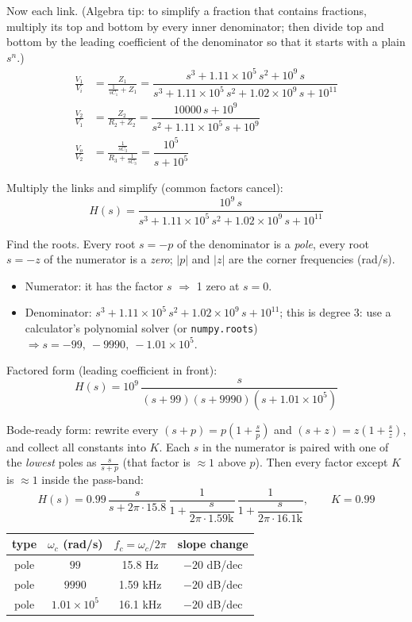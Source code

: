 \documentclass[11pt]{article}
\newcommand{\solstep}[2]{\par\medskip{\color{stepc}\textbf{Step #1 --- #2}}\par\nopagebreak}
\begin{document}
Now each link. {\small (Algebra tip: to simplify a fraction that contains fractions, multiply its top and bottom by every inner denominator; then divide top and bottom by the leading coefficient of the denominator so that it starts with a plain $s^n$.)}
\begin{align*}
\frac{V_{1}}{V_{i}} &= \frac{Z_{1}}{\frac{1}{sC_{1}} + Z_{1}} = \dfrac{s^{3} + 1.11\times 10^{5}\,s^{2} + 10^{9}\,s}{s^{3} + 1.11\times 10^{5}\,s^{2} + 1.02\times 10^{9}\,s + 10^{11}} \\
\frac{V_{2}}{V_{1}} &= \frac{Z_{2}}{R_{2} + Z_{2}} = \dfrac{10000\,s + 10^{9}}{s^{2} + 1.11\times 10^{5}\,s + 10^{9}} \\
\frac{V_{o}}{V_{2}} &= \frac{\frac{1}{sC_{3}}}{R_{3} + \frac{1}{sC_{3}}} = \dfrac{10^{5}}{s + 10^{5}}
\end{align*}

Multiply the links and simplify (common factors cancel):\[
H(s) = \dfrac{10^{9}\,s}{s^{3} + 1.11\times 10^{5}\,s^{2} + 1.02\times 10^{9}\,s + 10^{11}}
\]

\solstep{5}{Standard (Bode-ready) form}Find the roots. Every root $s=-p$ of the denominator is a \emph{pole}, every root $s=-z$ of the numerator is a \emph{zero}; $|p|$ and $|z|$ are the corner frequencies (rad/s).
\begin{itemize}[leftmargin=*,itemsep=2pt]
\item Numerator: it has the factor $s$ $\Rightarrow$ 1 zero at $s=0$.
\item Denominator: $s^{3} + 1.11\times 10^{5}\,s^{2} + 1.02\times 10^{9}\,s + 10^{11}$; this is degree 3: use a calculator's polynomial solver (or \texttt{numpy.roots}) $\Rightarrow s = -99,\ -9990,\ -1.01\times 10^{5}$.
\end{itemize}

Factored form (leading coefficient in front):
\[
H(s) = 10^{9}\,\dfrac{s}{(s+99)(s+9990)(s+1.01\times 10^{5})}
\]

Bode-ready form: rewrite every $(s+p) = p\left(1+\frac{s}{p}\right)$ and $(s+z) = z\left(1+\frac{s}{z}\right)$, and collect all constants into $K$. Each $s$ in the numerator is paired with one of the \emph{lowest} poles as $\frac{s}{s+p}$ (that factor is $\approx 1$ above $p$). Then every factor except $K$ is $\approx 1$ inside the pass-band:
\[
H(s) = 0.99\,\dfrac{s}{s+2\pi\cdot 15.8}\,\dfrac{1}{1+\dfrac{s}{2\pi\cdot 1.59\mathrm{k}}}\,\dfrac{1}{1+\dfrac{s}{2\pi\cdot 16.1\mathrm{k}}},\qquad K = 0.99
\]

\begin{center}\renewcommand{\arraystretch}{1.35}
\begin{tabular}{cccc}
\toprule
type & $\omega_c$ (rad/s) & $f_c=\omega_c/2\pi$ & slope change \\
\midrule
pole & $99$ & 15.8 Hz & $-20$ dB/dec \\
pole & $9990$ & 1.59 kHz & $-20$ dB/dec \\
pole & $1.01\times 10^{5}$ & 16.1 kHz & $-20$ dB/dec \\
\bottomrule
\end{tabular}\end{center}
\end{document}
